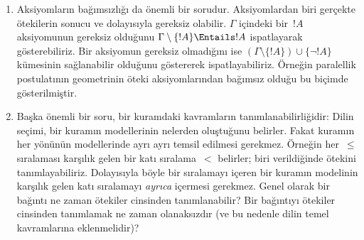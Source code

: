 \documentclass[../../../include/open-logic-section]{subfiles}
\begin{document}
\begin{explain}
\begin{enumerate}
  model kurmak için mantıksal yöntemleri kullanabiliriz.
\item Aksiyomların bağımsızlığı da önemli bir sorudur. Aksiyomlardan
  biri gerçekte ötekilerin sonucu ve dolayısıyla gereksiz olabilir.
  $\Gamma$ içindeki bir~$!A$ aksiyomunun gereksiz olduğunu
  $\Gamma\setminus\{!A\}\Entails !A$ ispatlayarak gösterebiliriz.
  Bir aksiyomun gereksiz olmadığını ise
  $(\Gamma\setminus\{!A\})\cup\{\lnot !A\}$ kümesinin sağlanabilir
  olduğunu göstererek ispatlayabiliriz. Örneğin paralellik
  postulatının geometrinin öteki aksiyomlarından bağımsız olduğu bu
  biçimde gösterilmiştir.
\item Başka önemli bir soru, bir kuramdaki kavramların
  tanımlanabilirliğidir: Dilin seçimi, bir kuramın modellerinin nelerden
  oluştuğunu belirler. Fakat kuramın her yönünün modellerinde ayrı ayrı
  temsil edilmesi gerekmez. Örneğin her~$\leq$ sıralaması karşılık
  gelen bir katı sıralama~$<$ belirler; biri verildiğinde ötekini
  tanımlayabiliriz. Dolayısıyla böyle bir sıralamayı içeren bir kuramın
  modelinin karşılık gelen katı sıralamayı \emph{ayrıca} içermesi
  gerekmez. Genel olarak bir bağıntı ne zaman ötekiler cinsinden
  tanımlanabilir? Bir bağıntıyı ötekiler cinsinden tanımlamak ne zaman
  olanaksızdır (ve bu nedenle dilin temel kavramlarına eklenmelidir)?
\end{enumerate}
\end{explain}
\end{document}
